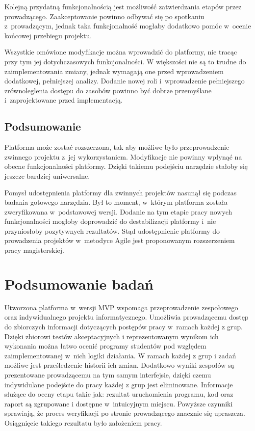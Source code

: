 Kolejną przydatną funkcjonalnością jest możliwość zatwierdzania etapów przez prowadzącego.
Zaakceptowanie powinno odbywać się po spotkaniu z~prowadzącym, jednak taka funkcjonalność mogłaby dodatkowo pomóc w~ocenie końcowej przebiegu projektu.

Wszystkie omówione modyfikacje można wprowadzić do platformy, nie tracąc przy tym jej dotychczasowych funkcjonalności.
W większości nie są to trudne do zaimplementowania zmiany, jednak wymagają one przed wprowadzeniem dodatkowej, pełniejszej analizy.
Dodanie nowej roli i~wprowadzenie pełniejszego zrównoleglenia dostępu do zasobów powinno być dobrze przemyślane i~zaprojektowane przed implementacją.

\subsection{Podsumowanie}

Platforma może zostać rozszerzona, tak aby możliwe było przeprowadzenie zwinnego projektu z~jej wykorzystaniem.
Modyfikacje nie powinny wpłynąć na obecne funkcjonalności platformy.
Dzięki takiemu podejściu narzędzie stałoby się jeszcze bardziej uniwersalne.

Pomysł udostępnienia platformy dla zwinnych projektów nasunął się podczas badania gotowego narzędzia.
Był to moment, w~którym platforma została zweryfikowana w~podstawowej wersji.
Dodanie na tym etapie pracy nowych funkcjonalności mogłoby doprowadzić do destabilizacji platformy i~nie przyniosłoby pozytywnych rezultatów.
Stąd udostępnienie platformy do prowadzenia projektów w~metodyce Agile jest proponowanym rozszerzeniem pracy magisterskiej.


\section{Podsumowanie badań}
\label{research_summary}

Utworzona platforma w~wersji MVP wspomaga przeprowadzenie zespołowego oraz indywidualnego projektu informatycznego.
Umożliwia prowadzącemu dostęp do zbiorczych informacji dotyczących postępów pracy w~ramach każdej z grup.
Dzięki zbiorowi testów akceptacyjnych i reprezentowanym wynikom ich wykonania można łatwo ocenić programy studentów pod względem zaimplementowanej w~nich logiki działania.
W ramach każdej z grup i zadań możliwe jest prześledzenie historii ich zmian.
Dodatkowo wyniki zespołów są prezentowane prowadzącemu na tym samym interfejsie, dzięki czemu indywidulane podejście do pracy każdej z grup jest eliminowane.
Informacje służące do oceny etapu takie jak: rezultat uruchomienia programu, kod oraz raport są zgrupowane i dostępne w~intuicyjnym miejscu.
Powyższe czynniki sprawiają, że proces weryfikacji po stronie prowadzącego znacznie się upraszcza.
Osiągnięcie takiego rezultatu było założeniem pracy.

